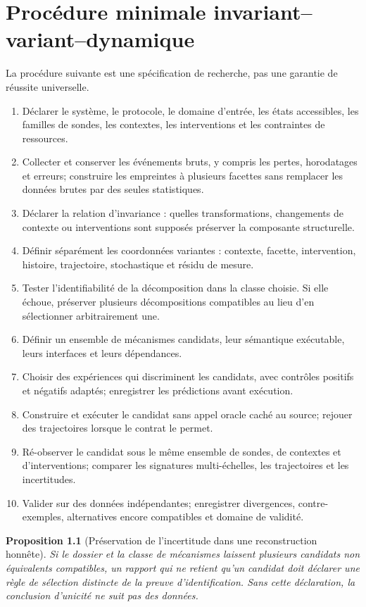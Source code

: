 \documentclass[11pt,oneside]{book}
\newtheorem{proposition}[theoreme]{Proposition}
\theoremstyle{definition}
\theoremstyle{remark}
\newcommand{\1}{\mathbf 1}
\begin{document}
\chapter{Procédure minimale invariant--variant--dynamique}
La procédure suivante est une spécification de recherche, pas une garantie de réussite universelle.
\begin{enumerate}[label=\textbf{P\arabic*.}]
\item Déclarer le système, le protocole, le domaine d'entrée, les états accessibles, les familles de sondes, les contextes, les interventions et les contraintes de ressources.
\item Collecter et conserver les événements bruts, y compris les pertes, horodatages et erreurs; construire les empreintes à plusieurs facettes sans remplacer les données brutes par des seules statistiques.
\item Déclarer la relation d'invariance : quelles transformations, changements de contexte ou interventions sont supposés préserver la composante structurelle.
\item Définir séparément les coordonnées variantes : contexte, facette, intervention, histoire, trajectoire, stochastique et résidu de mesure.
\item Tester l'identifiabilité de la décomposition dans la classe choisie. Si elle échoue, préserver plusieurs décompositions compatibles au lieu d'en sélectionner arbitrairement une.
\item Définir un ensemble de mécanismes candidats, leur sémantique exécutable, leurs interfaces et leurs dépendances.
\item Choisir des expériences qui discriminent les candidats, avec contrôles positifs et négatifs adaptés; enregistrer les prédictions avant exécution.
\item Construire et exécuter le candidat sans appel oracle caché au source; rejouer des trajectoires lorsque le contrat le permet.
\item Ré-observer le candidat sous le même ensemble de sondes, de contextes et d'interventions; comparer les signatures multi-échelles, les trajectoires et les incertitudes.
\item Valider sur des données indépendantes; enregistrer divergences, contre-exemples, alternatives encore compatibles et domaine de validité.
\end{enumerate}
\begin{proposition}[Préservation de l'incertitude dans une reconstruction honnête]
Si le dossier et la classe de mécanismes laissent plusieurs candidats non équivalents compatibles, un rapport qui ne retient qu'un candidat doit déclarer une règle de sélection distincte de la preuve d'identification. Sans cette déclaration, la conclusion d'unicité ne suit pas des données.
\end{proposition}
\end{document}
